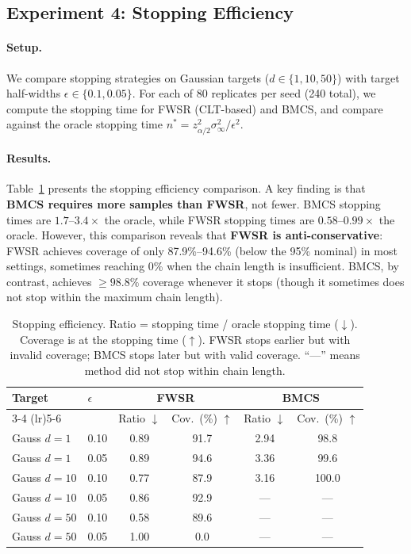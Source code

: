\documentclass[11pt]{article}
\begin{document}
\subsection{Experiment 4: Stopping Efficiency}

\paragraph{Setup.} We compare stopping strategies on Gaussian targets ($d \in \{1, 10, 50\}$) with target half-widths $\epsilon \in \{0.1, 0.05\}$. For each of 80 replicates per seed (240 total), we compute the stopping time for FWSR (CLT-based) and BMCS, and compare against the oracle stopping time $n^* = z_{\alpha/2}^2 \sigma^2_\infty / \epsilon^2$.

\paragraph{Results.} Table~\ref{tab:stopping} presents the stopping efficiency comparison. A key finding is that \textbf{BMCS requires more samples than FWSR}, not fewer. BMCS stopping times are $1.7$--$3.4\times$ the oracle, while FWSR stopping times are $0.58$--$0.99\times$ the oracle. However, this comparison reveals that \textbf{FWSR is anti-conservative}: FWSR achieves coverage of only 87.9\%--94.6\% (below the 95\% nominal) in most settings, sometimes reaching 0\% when the chain length is insufficient. BMCS, by contrast, achieves $\geq 98.8\%$ coverage whenever it stops (though it sometimes does not stop within the maximum chain length).

\begin{table}[t]
\caption{Stopping efficiency. Ratio = stopping time / oracle stopping time ($\downarrow$). Coverage is at the stopping time ($\uparrow$). FWSR stops earlier but with invalid coverage; BMCS stops later but with valid coverage. ``---'' means method did not stop within chain length.}
\label{tab:stopping}
\centering
\begin{tabular}{llcccc}
\toprule
Target & $\epsilon$ & \multicolumn{2}{c}{FWSR} & \multicolumn{2}{c}{BMCS} \\
\cmidrule(lr){3-4} \cmidrule(lr){5-6}
 & & Ratio $\downarrow$ & Cov.\ (\%) $\uparrow$ & Ratio $\downarrow$ & Cov.\ (\%) $\uparrow$ \\
\midrule
Gauss $d\!=\!1$ & 0.10 & 0.89 & 91.7 & 2.94 & 98.8 \\
Gauss $d\!=\!1$ & 0.05 & 0.89 & 94.6 & 3.36 & 99.6 \\
Gauss $d\!=\!10$ & 0.10 & 0.77 & 87.9 & 3.16 & 100.0 \\
Gauss $d\!=\!10$ & 0.05 & 0.86 & 92.9 & --- & --- \\
Gauss $d\!=\!50$ & 0.10 & 0.58 & 89.6 & --- & --- \\
Gauss $d\!=\!50$ & 0.05 & 1.00 & 0.0 & --- & --- \\
\bottomrule
\end{tabular}
\end{table}
\end{document}
